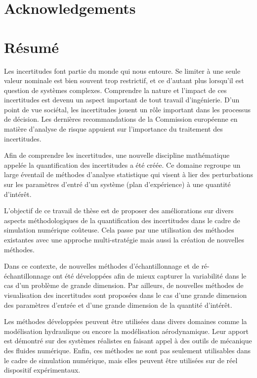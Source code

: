 
\cleardoublepage
\chapter*{Acknowledgements}


\newpage
{}
\chapter*{Résumé}

Les incertitudes font partie du monde qui nous entoure. Se limiter à une seule valeur nominale est bien souvent trop restrictif, et ce d'autant plus lorsqu'il est question de systèmes complexes. Comprendre la nature et l'impact de ces incertitudes est devenu un aspect important de tout travail d'ingénierie. D'un point de vue sociétal, les incertitudes jouent un rôle important dans les processus de décision. Les dernières recommandations de la Commission européenne en matière d'analyse de risque appuient sur l'importance du traitement des incertitudes.

Afin de comprendre les incertitudes, une nouvelle discipline mathématique appelée la quantification des incertitudes a été créée. Ce domaine regroupe un large éventail de méthodes d'analyse statistique qui visent à lier des perturbations sur les paramètres d'entré d'un système (plan d'expérience) à une quantité d'intérêt.

L'objectif de ce travail de thèse est de proposer des améliorations sur divers aspects méthodologiques de la quantification des incertitudes dans le cadre de simulation numérique coûteuse. Cela passe par une utilisation des méthodes existantes avec une approche multi-stratégie mais aussi la création de nouvelles méthodes.

Dans ce contexte, de nouvelles méthodes d'échantillonnage et de ré-échantillonnage ont été développées afin de mieux capturer la variabilité dans le cas d'un problème de grande dimension. Par ailleurs, de nouvelles méthodes de visualisation des incertitudes sont proposées dans le cas d'une grande dimension des paramètres d'entrée et d'une grande dimension de la quantité d'intérêt.

Les méthodes développées peuvent être utilisées dans divers domaines comme la modélisation hydraulique ou encore la modélisation aérodynamique. Leur apport est démontré sur des systèmes réalistes en faisant appel à des outils de mécanique des fluides numérique. Enfin, ces méthodes ne sont pas seulement utilisables dans le cadre de simulation numérique, mais elles peuvent être utilisées sur de réel dispositif expérimentaux.\\

